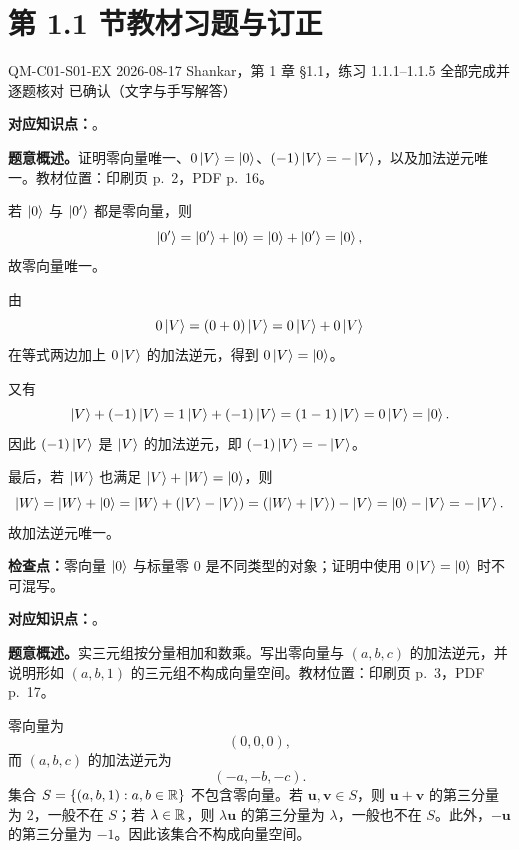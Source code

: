 
\section{第 1.1 节教材习题与订正}
\label{exercise-set:QM-C01-S01}

\exercisemeta
  {QM-C01-S01-EX}
  {2026-08-17}
  {Shankar，第 1 章 \S 1.1，练习 1.1.1--1.1.5}
  {全部完成并逐题核对}
  {已确认（文字与手写解答）}


\textbf{对应知识点：}。

\textbf{题意概述。}证明零向量唯一、$0\left|V\right\rangle=\left|0\right\rangle$、$(-1)\left|V\right\rangle=-\left|V\right\rangle$，以及加法逆元唯一。教材位置：印刷页 p.~2，PDF p.~16。

\begin{checkedsolution}
若 $\left|0\right\rangle$ 与 $\left|0'\right\rangle$ 都是零向量，则
\[
  \left|0'\right\rangle=\left|0'\right\rangle+\left|0\right\rangle
  =\left|0\right\rangle+\left|0'\right\rangle=\left|0\right\rangle,
\]
故零向量唯一。

由
\[
  0\left|V\right\rangle=(0+0)\left|V\right\rangle=0\left|V\right\rangle+0\left|V\right\rangle
\]
在等式两边加上 $0\left|V\right\rangle$ 的加法逆元，得到 $0\left|V\right\rangle=\left|0\right\rangle$。

又有
\[
  \left|V\right\rangle+(-1)\left|V\right\rangle
  =1\left|V\right\rangle+(-1)\left|V\right\rangle
  =(1-1)\left|V\right\rangle
  =0\left|V\right\rangle=\left|0\right\rangle.
\]
因此 $(-1)\left|V\right\rangle$ 是 $\left|V\right\rangle$ 的加法逆元，即 $(-1)\left|V\right\rangle=-\left|V\right\rangle$。

最后，若 $\left|W\right\rangle$ 也满足 $\left|V\right\rangle+\left|W\right\rangle=\left|0\right\rangle$，则
\[
  \left|W\right\rangle=\left|W\right\rangle+\left|0\right\rangle
  =\left|W\right\rangle+(\left|V\right\rangle-\left|V\right\rangle)
  =(\left|W\right\rangle+\left|V\right\rangle)-\left|V\right\rangle
  =\left|0\right\rangle-\left|V\right\rangle=-\left|V\right\rangle.
\]
故加法逆元唯一。
\end{checkedsolution}

\textbf{检查点：}零向量 $\left|0\right\rangle$ 与标量零 $0$ 是不同类型的对象；证明中使用 $0\left|V\right\rangle=\left|0\right\rangle$ 时不可混写。


\textbf{对应知识点：}。

\textbf{题意概述。}实三元组按分量相加和数乘。写出零向量与 $(a,b,c)$ 的加法逆元，并说明形如 $(a,b,1)$ 的三元组不构成向量空间。教材位置：印刷页 p.~3，PDF p.~17。

\begin{checkedsolution}
零向量为
\[
  (0,0,0),
\]
而 $(a,b,c)$ 的加法逆元为
\[
  (-a,-b,-c).
\]
集合 $S=\{(a,b,1):a,b\in\mathbb{R}\}$ 不包含零向量。若 $\bm{u},\bm{v}\in S$，则 $\bm{u}+\bm{v}$ 的第三分量为 $2$，一般不在 $S$；若 $\lambda\in\mathbb{R}$，则 $\lambda\bm{u}$ 的第三分量为 $\lambda$，一般也不在 $S$。此外，$-\bm{u}$ 的第三分量为 $-1$。因此该集合不构成向量空间。
\end{checkedsolution}

